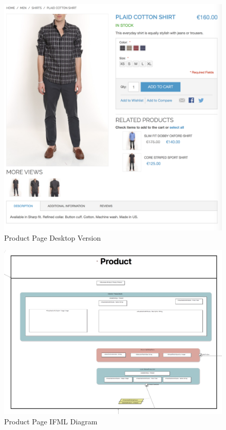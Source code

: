 \vspace{0.5cm}
\begin{figure}[H]
  \centering
    \includegraphics[width=14cm]{images/diagrams/before/desktop-product.png}
  \caption{Product Page Desktop Version}
  \label{fig:desktop-before-product}
\end{figure}

\vspace{0.5cm}
\begin{figure}[H]
  \centering
    \includegraphics[width=14cm]{images/diagrams/before/ifml-product.png}
  \caption{Product Page IFML Diagram}
  \label{fig:ifml-before-product}
\end{figure}
\vspace{0.5cm}

